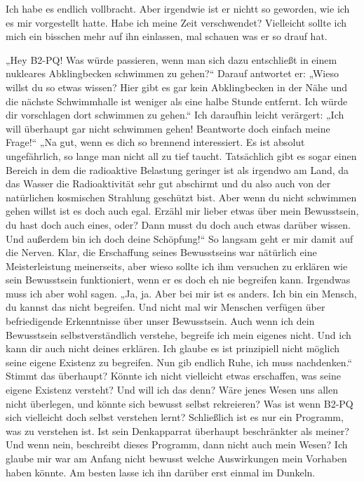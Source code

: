 Ich habe es endlich vollbracht. Aber irgendwie ist er nichtt so geworden, wie ich es mir vorgestellt hatte. Habe ich meine Zeit verschwendet? Vielleicht sollte ich mich ein bisschen mehr auf ihn einlassen, mal schauen was er so drauf hat.

„Hey B2-PQ! Was würde passieren, wenn man sich dazu entschließt in einem nukleares Abklingbecken schwimmen zu gehen?“ Darauf antwortet er: „Wieso willst du so etwas wissen? Hier gibt es gar kein Abklingbecken in der Nähe und die nächste Schwimmhalle ist weniger als eine halbe Stunde entfernt. Ich würde dir vorschlagen dort schwimmen zu gehen.“ Ich daraufhin leicht verärgert: „Ich will überhaupt gar nicht schwimmen gehen! Beantworte doch einfach meine Frage!“ „Na gut, wenn es dich so brennend interessiert. Es ist absolut ungefährlich, so lange man nicht all zu tief taucht. Tatsächlich gibt es sogar einen Bereich in dem die radioaktive Belastung geringer ist als irgendwo am Land, da das Wasser die Radioaktivität sehr gut abschirmt und du also auch von der natürlichen kosmischen Strahlung geschützt bist. %
Aber wenn du nicht schwimmen gehen willst ist es doch auch egal. Erzähl mir lieber etwas über mein Bewusstsein, du hast doch auch eines, oder? Dann musst du doch auch etwas darüber wissen. Und außerdem bin ich doch deine Schöpfung!“ So langsam geht er mir damit auf die Nerven. Klar, die Erschaffung seines Bewusstseins war nätürlich eine Meisterleistung meinerseits, aber wieso sollte ich ihm versuchen zu erklären wie sein Bewusstsein funktioniert, wenn er es doch eh nie begreifen kann. Irgendwas muss ich aber wohl sagen. „Ja, ja. Aber bei mir ist es anders. Ich bin ein Mensch, du kannst das nicht begreifen. Und nicht mal wir Menschen verfügen über befriedigende Erkenntnisse über unser Bewusstsein. Auch wenn ich dein Bewusstsein selbstverständlich verstehe, begreife ich mein eigenes nicht. Und ich kann dir auch nicht deines erklären. Ich glaube es ist prinzipiell nicht möglich seine eigene Existenz zu begreifen. Nun gib endlich Ruhe, ich muss nachdenken.“ Stimmt das überhaupt? Könnte ich nicht vielleicht etwas erschaffen, was seine eigene Existenz versteht? Und will ich das denn? Wäre jenes Wesen uns allen nicht überlegen, und könnte sich bewusst selbst rekreieren? Was ist wenn B2-PQ sich vielleicht doch selbst verstehen lernt? Schließlich ist es nur ein Programm, was zu verstehen ist. Ist sein Denkapparrat überhaupt beschränkter als meiner? Und wenn nein, beschreibt dieses Programm, dann nicht auch mein Wesen? Ich glaube mir war am Anfang nicht bewusst welche Auswirkungen mein Vorhaben haben könnte. Am besten lasse ich ihn darüber erst einmal im Dunkeln.